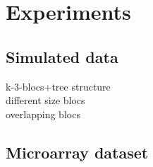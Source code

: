 \section{Experiments}
\label{experiments}

\subsection{Simulated data}
k-3-blocs+tree structure\\

different size blocs\\

overlapping blocs\\

\subsection{Microarray dataset}
